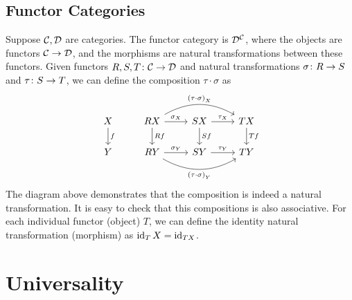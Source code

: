 \subsection*{Functor Categories}

\begin{definition}
    Suppose \(\mathcal{C},\mathcal{D}\) are categories.
    The functor category is \(\mathcal{D}^{\mathcal{C}}\),
    where the objects are functors \(\mathcal{C}\to\mathcal{D}\),
    and the morphisms are natural transformations between these functors.
    Given functors \(R,S,T\colon\mathcal{C}\to\mathcal{D}\)
    and natural transformations \(\sigma\colon R\to S\) and \(\tau\colon S\to T\),
    we can define the composition \(\tau\cdot\sigma\) as
    \begin{equation*}
        \begin{tikzcd}
            X \arrow{d}{f} & RX \arrow{d}{Rf} \arrow{r}{\sigma_X} \arrow[bend left]{rr}{{(\tau\cdot\sigma)}_X} &
            SX \arrow{d}{Sf} \arrow{r}{\tau_X} & TX \arrow{d}{Tf} \\
            Y & RY \arrow{r}{\sigma_Y} \arrow[bend right]{rr}[swap]{{(\tau\cdot\sigma)}_Y} & SY \arrow{r}{\tau_Y} & TY
        \end{tikzcd}
    \end{equation*}
    The diagram above demonstrates that the composition is indeed a natural transformation.
    It is easy to check that this compositions is also associative.
    For each individual functor (object) \(T\),
    we can define the identity natural transformation (morphism) as \(\operatorname{id}_T X = \operatorname{id}_{TX}\).
\end{definition}


\section{Universality}\label{sec:universality}



